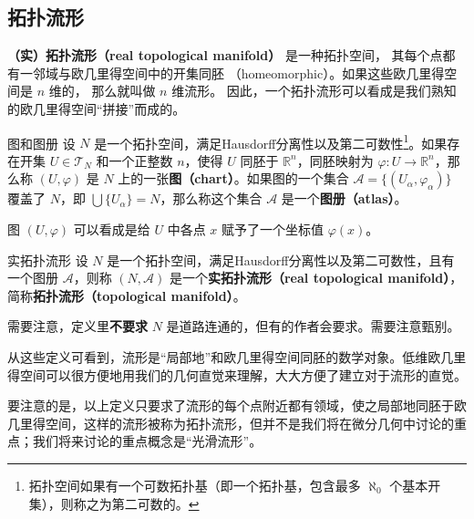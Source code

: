 

\subsection{拓扑流形}

\textbf{（实）拓扑流形（real topological manifold）} 是一种拓扑空间， 其每个点都有一邻域与欧几里得空间中的开集同胚 （homeomorphic）。如果这些欧几里得空间是 $n$ 维的， 那么就叫做 $n$ 维流形。 因此，一个拓扑流形可以看成是我们熟知的欧几里得空间“拼接”而成的。

\begin{definition}{图和图册}\label{def_Manif_1}
设 $N$ 是一个拓扑空间，满足Hausdorff分离性以及第二可数性\footnote{拓扑空间如果有一个可数拓扑基（即一个拓扑基，包含最多 $\aleph_0$ 个基本开集），则称之为第二可数的。}。如果存在开集 $U\in\mathcal{T}_N$ 和一个正整数 $n$，使得 $U$ 同胚于 $\mathbb{R}^n$，同胚映射为 $\varphi:U\rightarrow\mathbb{R}^n$，那么称 $(U,\varphi)$ 是 $N$ 上的一张\textbf{图（chart）}。如果图的一个集合 $\mathcal{A}=\{(U_\alpha, \varphi_\alpha)\}$ 覆盖了 $N$，即 $\bigcup\{U_\alpha\}=N$，那么称这个集合 $\mathcal{A}$ 是一个\textbf{图册（atlas）}。
\end{definition}

图 $(U, \varphi)$ 可以看成是给 $U$ 中各点 $x$ 赋予了一个坐标值 $\varphi(x)$。

\begin{definition}{实拓扑流形}\label{def_Manif_2}
设 $N$ 是一个拓扑空间，满足Hausdorff分离性以及第二可数性，且有一个图册 $\mathcal{A}$，则称 $(N, \mathcal{A})$ 是一个\textbf{实拓扑流形（real topological manifold）}，简称\textbf{拓扑流形（topological manifold）}。
\end{definition}

需要注意，定义里\textbf{不要求} $N$ 是道路连通的，但有的作者会要求。需要注意甄别。

从这些定义可看到，流形是“局部地”和欧几里得空间同胚的数学对象。低维欧几里得空间可以很方便地用我们的几何直觉来理解，大大方便了建立对于流形的直觉。

要注意的是，以上定义只要求了流形的每个点附近都有领域，使之局部地同胚于欧几里得空间，这样的流形被称为拓扑流形，但并不是我们将在微分几何中讨论的重点；我们将来讨论的重点概念是“光滑流形”。


